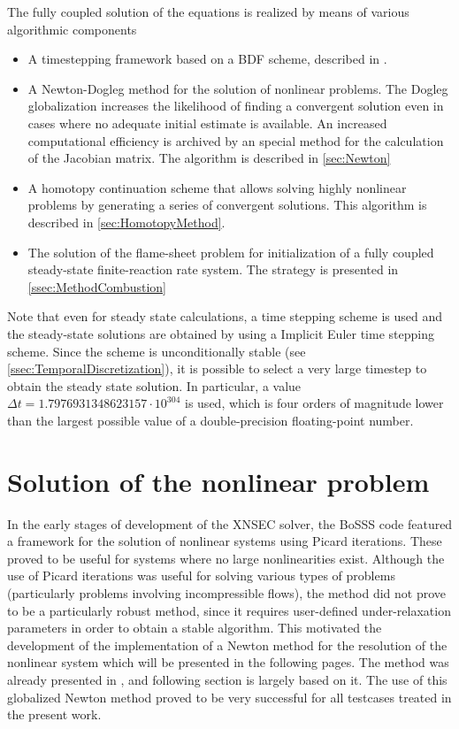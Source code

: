 The fully coupled solution of the equations is realized by means of various algorithmic components
\begin{itemize}
\item A timestepping framework based on a \gls{BDF} scheme, described in \textcite{kummer2018}.
\item A Newton-Dogleg method for the solution of nonlinear problems. The Dogleg globalization increases the likelihood of finding a convergent solution even in cases where no adequate initial estimate is available. An increased computational efficiency is archived by an special method for the calculation of the Jacobian matrix. The algorithm is described in \cref{sec:Newton}
\item A homotopy continuation scheme that allows solving highly nonlinear problems by generating a series of convergent solutions. This algorithm is described in \cref{sec:HomotopyMethod}.
\item  The solution of the flame-sheet problem for initialization of a fully coupled steady-state finite-reaction rate system. The strategy is presented in \cref{ssec:MethodCombustion}
\end{itemize}

Note that even for steady state calculations, a time stepping scheme is used and the steady-state solutions are obtained by using a Implicit Euler time stepping scheme. Since the scheme is unconditionally stable (see \cref{ssec:TemporalDiscretization}), it is possible to select a very large timestep to obtain the steady state solution. In particular, a value $\Delta t = 1.7976931348623157\cdot 10^{304}$ is used, which is four orders of magnitude lower than the largest possible value of a double-precision floating-point number.
\section{Solution of the nonlinear problem}\label{sec:SolNonLinProblem}
In the early stages of development of the XNSEC solver, the BoSSS code featured a framework for the solution of nonlinear systems using Picard iterations. These proved to be useful for systems where no large nonlinearities exist. Although the use of Picard iterations was useful for solving various types of problems (particularly problems involving incompressible flows), the method did not prove to be a particularly robust method, since it requires user-defined under-relaxation parameters in order to obtain a stable algorithm. This motivated the development of the implementation of a Newton method for the resolution of the nonlinear system which will be presented in the following pages. The method was already presented in \parencite{kikkerFullyCoupledHighorder,gutierrez-jorqueraFullyCoupledHighorder2022}, and following section is largely based on it. The use of this globalized Newton method proved to be very successful for all testcases treated in the present work.  

